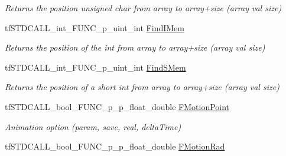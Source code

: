\begin{DoxyCompactItemize}
\begin{DoxyCompactList}\small\item\em Returns the position unsigned char from array to array+size (array val size) \end{DoxyCompactList}\item 
\hypertarget{structs_functions_extension_c_p_u_a79a10fe1ee8762a8b15665a5be9830fa}{tf\-S\-T\-D\-C\-A\-L\-L\-\_\-int\-\_\-\-F\-U\-N\-C\-\_\-p\-\_\-uint\-\_\-int \hyperlink{structs_functions_extension_c_p_u_a79a10fe1ee8762a8b15665a5be9830fa}{Find\-I\-Mem}}\label{structs_functions_extension_c_p_u_a79a10fe1ee8762a8b15665a5be9830fa}

\begin{DoxyCompactList}\small\item\em Returns the position of the int from array to array+size (array val size) \end{DoxyCompactList}\item 
\hypertarget{structs_functions_extension_c_p_u_a1a3ffde54f0f1d1eb9e06f0afa1bdb18}{tf\-S\-T\-D\-C\-A\-L\-L\-\_\-int\-\_\-\-F\-U\-N\-C\-\_\-p\-\_\-uint\-\_\-int \hyperlink{structs_functions_extension_c_p_u_a1a3ffde54f0f1d1eb9e06f0afa1bdb18}{Find\-S\-Mem}}\label{structs_functions_extension_c_p_u_a1a3ffde54f0f1d1eb9e06f0afa1bdb18}

\begin{DoxyCompactList}\small\item\em Returns the position of a short int from array to array+size (array val size) \end{DoxyCompactList}\item 
\hypertarget{structs_functions_extension_c_p_u_a359902f9820a7f7915a28d8d21994d74}{tf\-S\-T\-D\-C\-A\-L\-L\-\_\-bool\-\_\-\-F\-U\-N\-C\-\_\-p\-\_\-p\-\_\-float\-\_\-double \hyperlink{structs_functions_extension_c_p_u_a359902f9820a7f7915a28d8d21994d74}{F\-Motion\-Point}}\label{structs_functions_extension_c_p_u_a359902f9820a7f7915a28d8d21994d74}

\begin{DoxyCompactList}\small\item\em Animation option (param, save, real, delta\-Time) \end{DoxyCompactList}\item 
\hypertarget{structs_functions_extension_c_p_u_abbbeb3e8dc0f887af896adcb51047a17}{tf\-S\-T\-D\-C\-A\-L\-L\-\_\-bool\-\_\-\-F\-U\-N\-C\-\_\-p\-\_\-p\-\_\-float\-\_\-double \hyperlink{structs_functions_extension_c_p_u_abbbeb3e8dc0f887af896adcb51047a17}{F\-Motion\-Rad}}\label{structs_functions_extension_c_p_u_abbbeb3e8dc0f887af896adcb51047a17}


\end{DoxyCompactItemize}

